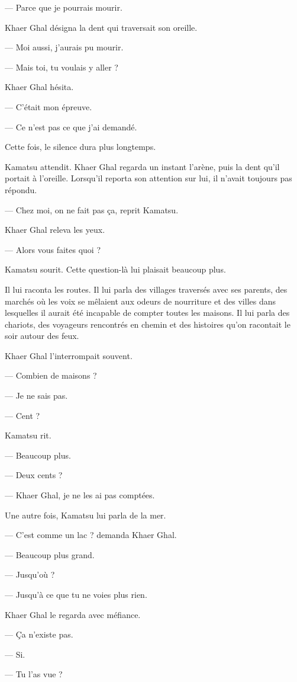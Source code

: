 — Parce que je pourrais mourir.

Khaer Ghal désigna la dent qui traversait son oreille.

— Moi aussi, j'aurais pu mourir.

— Mais toi, tu voulais y aller ?

Khaer Ghal hésita.

— C'était mon épreuve.

— Ce n'est pas ce que j'ai demandé.

Cette fois, le silence dura plus longtemps.

Kamatsu attendit. Khaer Ghal regarda un instant l'arène, puis la dent qu'il
portait à l'oreille. Lorsqu'il reporta son attention sur lui, il n'avait
toujours pas répondu.

— Chez moi, on ne fait pas ça, reprit Kamatsu.

Khaer Ghal releva les yeux.

— Alors vous faites quoi ?

Kamatsu sourit. Cette question-là lui plaisait beaucoup plus.

Il lui raconta les routes. Il lui parla des villages traversés avec ses
parents, des marchés où les voix se mêlaient aux odeurs de nourriture et des
villes dans lesquelles il aurait été incapable de compter toutes les maisons.
Il lui parla des chariots, des voyageurs rencontrés en chemin et des histoires
qu'on racontait le soir autour des feux.

Khaer Ghal l'interrompait souvent.

— Combien de maisons ?

— Je ne sais pas.

— Cent ?

Kamatsu rit.

— Beaucoup plus.

— Deux cents ?

— Khaer Ghal, je ne les ai pas comptées.

Une autre fois, Kamatsu lui parla de la mer.

— C'est comme un lac ? demanda Khaer Ghal.

— Beaucoup plus grand.

— Jusqu'où ?

— Jusqu'à ce que tu ne voies plus rien.

Khaer Ghal le regarda avec méfiance.

— Ça n'existe pas.

— Si.

— Tu l'as vue ?

